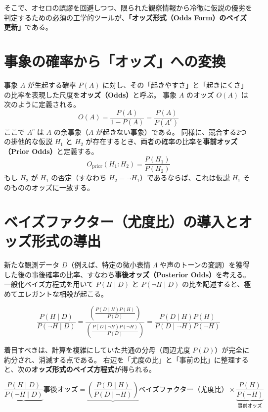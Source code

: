 そこで、オセロの誤謬を回避しつつ、限られた観察情報から冷徹に仮説の優劣を判定するための必須の工学的ツールが、\textbf{「オッズ形式（Odds Form）のベイズ更新」}である。

\section{事象の確率から「オッズ」への変換}
事象 $A$ が生起する確率 $P(A)$ に対し、その「起きやすさ」と「起きにくさ」の比率を表現した尺度を\textbf{オッズ（Odds）}と呼ぶ。
事象 $A$ のオッズ $O(A)$ は次のように定義される。
\begin{equation}
O(A) = \frac{P(A)}{1 - P(A)} = \frac{P(A)}{P(A^c)}
\label{eq:odds_def}
\end{equation}
ここで $A^c$ は $A$ の余事象（$A$ が起きない事象）である。
同様に、競合する2つの排他的な仮説 $H_1$ と $H_2$ が存在するとき、両者の確率の比率を\textbf{事前オッズ（Prior Odds）}と定義する。
\begin{equation}
O_{\mathrm{prior}}(H_1 : H_2) = \frac{P(H_1)}{P(H_2)}
\label{eq:prior_odds}
\end{equation}
もし $H_2$ が $H_1$ の否定（すなわち $H_2 = \neg H_1$）であるならば、これは仮説 $H_1$ そのもののオッズに一致する。

\section{ベイズファクター（尤度比）の導入とオッズ形式の導出}
新たな観測データ $D$（例えば、特定の微小表情 $\Lambda$ や声のトーンの変調）を獲得した後の事後確率の比率、すなわち\textbf{事後オッズ（Posterior Odds）}を考える。
一般化ベイズ方程式を用いて $P(H \mid D)$ と $P(\neg H \mid D)$ の比を記述すると、極めてエレガントな相殺が起こる。

\begin{equation}
\frac{P(H \mid D)}{P(\neg H \mid D)}
= \frac{\left( \frac{P(D \mid H) P(H)}{P(D)} \right)}{\left( \frac{P(D \mid \neg H) P(\neg H)}{P(D)} \right)}
= \frac{P(D \mid H) P(H)}{P(D \mid \neg H) P(\neg H)}
\end{equation}

着目すべきは、計算を複雑にしていた共通の分母（周辺尤度 $P(D)$）が完全に約分され、消滅する点である。
右辺を「尤度の比」と「事前の比」に整理すると、次の\textbf{オッズ形式のベイズ方程式}が得られる。

\begin{equation}
\underbrace{\frac{P(H \mid D)}{P(\neg H \mid D)}}{\text{事後オッズ}}
= \underbrace{\left( \frac{P(D \mid H)}{P(D \mid \neg H)} \right)}{\text{ベイズファクター（尤度比）}}
\times \underbrace{\frac{P(H)}{P(\neg H)}}_{\text{事前オッズ}}
\label{eq:odds_bayes}
\end{equation}

